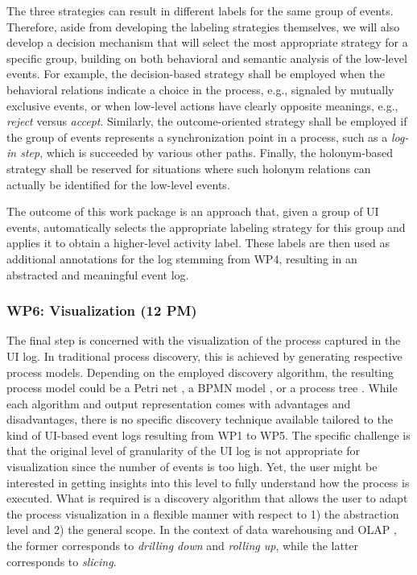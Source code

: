  The three strategies can result in different labels for the same group of events. Therefore, aside from developing the labeling strategies themselves, we will also develop a decision mechanism that will select the most appropriate strategy for a specific group, building on both behavioral and semantic analysis of the low-level events. For example, the decision-based strategy shall be employed when the behavioral relations indicate a choice in the process, e.g., signaled by mutually exclusive events, or when low-level actions have clearly opposite meanings, e.g., \emph{reject} versus \emph{accept}. Similarly, the outcome-oriented strategy shall be employed if the group of events represents a synchronization point in a process, such as a \emph{log-in step}, which is succeeded by various other paths. Finally, the holonym-based strategy shall be reserved for situations where such holonym relations can actually be identified for the low-level events. 

 The outcome of this work package is an approach that, given a group of UI events, automatically selects the appropriate labeling strategy for this group and applies it to obtain a higher-level activity label. These labels are then used as additional annotations for the log stemming from WP4, resulting in an abstracted and meaningful event log. 


\subsubsection{WP6: Visualization (12 PM)}
\label{sec:wp6}

The final step is concerned with the visualization of the process captured in the UI log. In traditional process discovery, this is achieved by generating respective process models. Depending on the employed discovery algorithm, the resulting process model could be a Petri net \cite{van2004workflow}, a BPMN model \cite{conforti2016bpmn}, or a process tree \cite{leemans2013discovering}. While each algorithm and output representation comes with advantages and disadvantages, there is no specific discovery technique available tailored to the kind of UI-based event logs resulting from WP1 to WP5. %
The specific challenge is that the original level of granularity of the UI log is not appropriate for visualization since the number of events is too high. Yet, the user might be interested in getting insights into this level to fully understand how the process is executed. What is required is a discovery algorithm that allows the user to adapt the process visualization in a flexible manner with respect to 1) the abstraction level and 2) the general scope. In the context of data warehousing and OLAP \cite{chaudhuri1997overview}, the former corresponds to \textit{drilling down} and \textit{rolling up}, while the latter corresponds to \textit{slicing}. 

